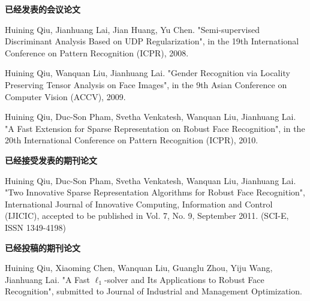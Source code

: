\begin{publications}{99}


\item[~] \textbf{已经发表的会议论文}
\item Huining Qiu, Jianhuang Lai, Jian Huang, Yu Chen. "Semi-supervised Discriminant Analysis Based on UDP
Regularization", in the 19th International Conference on Pattern Recognition (ICPR), 2008.
\item Huining Qiu, Wanquan Liu, Jianhuang Lai. "Gender Recognition via Locality Preserving Tensor Analysis on Face Images", in the 9th Asian Conference on Computer Vision (ACCV), 2009.
\item Huining Qiu, Duc-Son Pham, Svetha Venkatesh, Wanquan Liu, Jianhuang Lai. "A Fast Extension for Sparse Representation on Robust Face Recognition", in the 20th International Conference on Pattern Recognition (ICPR), 2010.

\item[~] \textbf{已经接受发表的期刊论文}
\item Huining Qiu, Duc-Son Pham, Svetha Venkatesh, Wanquan Liu, Jianhuang Lai. "Two Innovative Sparse Representation Algorithms for Robust Face Recognition", International Journal of Innovative Computing, Information and Control (IJICIC), accepted to be published in Vol. 7, No. 9, September 2011. (SCI-E, ISSN 1349-4198)

\item[~] \textbf{已经投稿的期刊论文}
\item Huining Qiu, Xiaoming Chen, Wanquan Liu, Guanglu Zhou, Yiju Wang, Jianhuang Lai. "A Fast $\ell_1$-solver and Its Applications to Robust Face Recognition", submitted to Journal of Industrial and Management Optimization. %


\end{publications}